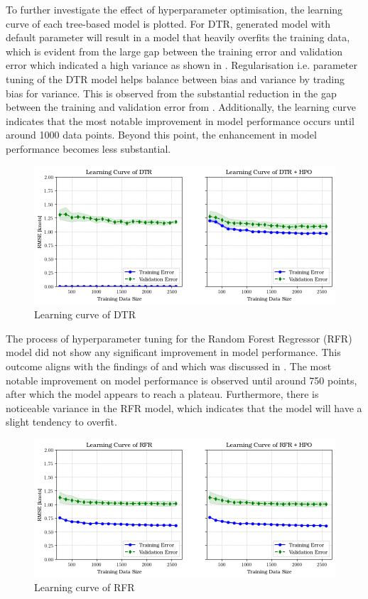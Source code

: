 To further investigate the effect of hyperparameter optimisation, the learning curve of each tree-based model is plotted. For DTR, generated model with default parameter will result in a model that heavily overfits the training data, which is evident from the large gap between the training error and validation error which indicated a high variance as shown in . Regularisation i.e. parameter tuning of the DTR model helps balance between bias and variance by trading bias for variance. This is observed from the substantial reduction in the gap between the training and validation error from . Additionally, the learning curve indicates that the most notable improvement in model performance occurs until around 1000 data points. Beyond this point, the enhancement in model performance becomes less substantial.\\

\begin{figure}[h]
    \centering
        \includegraphics[width=.95\textwidth]{02_figures/learning_curve_dtr.png}
        \caption{Learning curve of DTR}
        \label{fig:learn_curve_DTR_RMSE}
\end{figure}

The process of hyperparameter tuning for the Random Forest Regressor (RFR) model did not show any significant improvement in model performance. This outcome aligns with the findings of   and  which was discussed in . The most notable improvement on model performance is observed until around 750 points, after which the model appears to reach a plateau. Furthermore, there is noticeable variance in the RFR model, which indicates that the model will have a slight tendency to overfit.\\

\begin{figure}[h]
    \centering
        \includegraphics[width=.95\textwidth]{02_figures/learning_curve_rfr_rmse.png}
        \caption{Learning curve of RFR}
        \label{fig:learn_curve_RFR_RMSE}
\end{figure}


